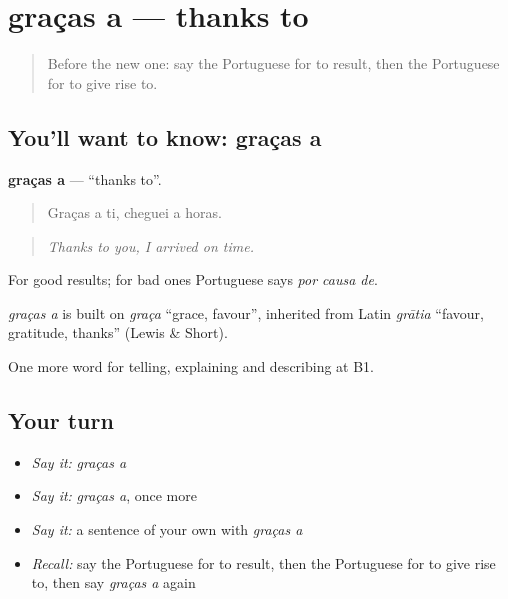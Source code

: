 \section[graças a]{graças a — thanks to}

\label{lesson:PT-C350-gracas-a}



\begin{quote}
Before the new one: say the Portuguese for to result, then the Portuguese for to give rise to.
\end{quote}

\subsection*{You'll want to know: graças a}
\textbf{graças a} — \textquotedblleft{}thanks to\textquotedblright{}.

\begin{quote}
Graças a ti, cheguei a horas.
\end{quote}

\begin{quote}
\emph{Thanks to you, I arrived on time.}
\end{quote}

For good results; for bad ones Portuguese says \emph{por causa de}.

\begin{cousinweb}
\emph{graças a} is built on \emph{graça} \textquotedblleft{}grace, favour\textquotedblright{}, inherited from Latin \emph{grātia} \textquotedblleft{}favour, gratitude, thanks\textquotedblright{} (Lewis \& Short).
\end{cousinweb}

\begin{grammarlens}[title={What you've built}]
One more word for telling, explaining and describing at B1.
\end{grammarlens}

\subsection*{Your turn}
\begin{itemize}
\raggedright
  \item \emph{Say it:} \emph{graças a}
  \item \emph{Say it:} \emph{graças a}, once more
  \item \emph{Say it:} a sentence of your own with \emph{graças a}
  \item \emph{Recall:} say the Portuguese for to result, then the Portuguese for to give rise to, then say \emph{graças a} again
\end{itemize}


